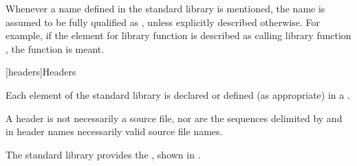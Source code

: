\pnum
Whenever a name  defined in the standard library is mentioned,
the name  is assumed to be fully qualified as
,
unless explicitly described otherwise. For example, if the \effects element
for library function  is described as calling library function ,
the function
is meant.

[headers]{Headers}

\pnum
Each element of the \Cpp{} standard library is declared or defined (as appropriate) in a
.
\begin{footnote}
A header is not necessarily a source file, nor are the
sequences delimited by \tcode{<} and \tcode{>} in header names necessarily valid source
file names.
\end{footnote}

\pnum
The \Cpp{} standard library provides the
,
shown in .

